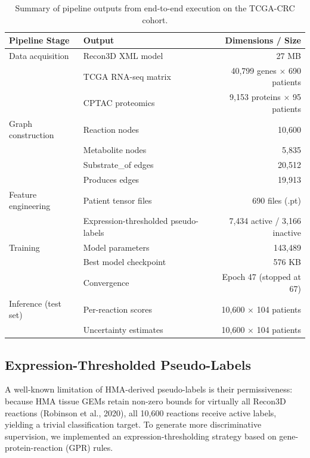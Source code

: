 \documentclass[12pt,a4paper]{article}
\begin{document}
\begin{table}[htbp]
\centering
\caption{Summary of pipeline outputs from end-to-end execution on the TCGA-CRC cohort.}
\label{tab:pipeline}
\renewcommand{\arraystretch}{1.3}
\small
\begin{tabularx}{\textwidth}{@{}l X r@{}}
\toprule
\textbf{Pipeline Stage} & \textbf{Output} & \textbf{Dimensions / Size} \\
\midrule
Data acquisition & Recon3D XML model & 27 MB \\
 & TCGA RNA-seq matrix & 40,799 genes $\times$ 690 patients \\
 & CPTAC proteomics & 9,153 proteins $\times$ 95 patients \\
\midrule
Graph construction & Reaction nodes & 10,600 \\
 & Metabolite nodes & 5,835 \\
 & Substrate\_of edges & 20,512 \\
 & Produces edges & 19,913 \\
\midrule
Feature engineering & Patient tensor files & 690 files (.pt) \\
 & Expression-thresholded pseudo-labels & 7,434 active / 3,166 inactive \\
\midrule
Training & Model parameters & 143,489 \\
 & Best model checkpoint & 576 KB \\
 & Convergence & Epoch 47 (stopped at 67) \\
\midrule
Inference (test set) & Per-reaction scores & 10,600 $\times$ 104 patients \\
 & Uncertainty estimates & 10,600 $\times$ 104 patients \\
\bottomrule
\end{tabularx}
\end{table}

\subsection{Expression-Thresholded Pseudo-Labels}

A well-known limitation of HMA-derived pseudo-labels is their permissiveness: because HMA tissue GEMs retain non-zero bounds for virtually all Recon3D reactions (Robinson et al., 2020), all 10,600 reactions receive active labels, yielding a trivial classification target. To generate more discriminative supervision, we implemented an expression-thresholding strategy based on gene-protein-reaction (GPR) rules.
\end{document}
